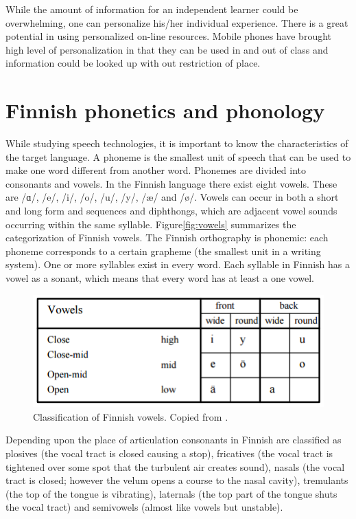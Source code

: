 \documentclass[11pt,a4paper,oneside,article]{memoir}
\begin{document}
While the amount of information for an independent learner could be overwhelming, one can personalize his/her individual experience. There is a great potential in using personalized on-line resources. Mobile phones have brought high level of personalization in that they can be used in and out of class and information could be looked up with out restriction of place.

\section{Finnish phonetics and phonology}
While studying speech technologies, it is important to know the characteristics of the target language. A phoneme is the smallest unit of speech that can be used to make one word different from another word. Phonemes are divided into consonants and vowels. In the Finnish language there exist eight vowels. These are  /ɑ/, /e/, /i/, /o/, /u/, /y/, /æ/ and /ø/. Vowels can occur in both a short and long form and sequences and diphthongs, which are adjacent vowel sounds occurring within the same syllable. \cite{silen} Figure\vref{fig:vowels} summarizes the categorization of Finnish vowels.
The Finnish orthography is phonemic: each phoneme corresponds to a certain grapheme (the smallest unit in a writing system). One or more syllables exist in every word. Each syllable in Finnish has a vowel as a sonant, which means that every word has at least a one vowel. \cite{silen}                                            

\begin{figure}[h]
  \includegraphics[width=12cm]{vowels}
  \caption{Classification of Finnish vowels. Copied from \cite{hut}.}
  \label{fig:vowels}
\end{figure}

Depending upon the place of articulation consonants in Finnish are classified as plosives (the vocal tract is closed causing a stop), fricatives (the vocal tract is tightened over some spot that the turbulent air creates sound), nasals (the vocal tract is closed; however the velum opens a course to the nasal cavity), tremulants (the top of the tongue is vibrating), laternals (the top part of the tongue shuts the vocal tract) and semivowels (almost like vowels but unstable). 
\end{document}
